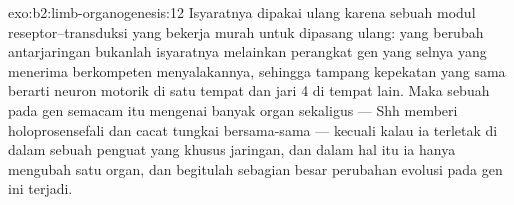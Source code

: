 \begin{solution}{exo:b2:limb-organogenesis:12}
Isyaratnya dipakai ulang karena sebuah modul reseptor--transduksi yang
bekerja murah untuk dipasang ulang: yang berubah antarjaringan bukanlah
isyaratnya melainkan perangkat gen yang selnya yang menerima berkompeten
menyalakannya, sehingga tampang kepekatan yang sama berarti neuron
motorik di satu tempat dan jari 4 di tempat lain. Maka sebuah 
pada gen semacam itu mengenai banyak organ sekaligus ---  Shh
memberi holoprosensefali dan cacat tungkai bersama-sama --- kecuali
kalau ia terletak di dalam sebuah penguat yang khusus jaringan, dan
dalam hal itu ia hanya mengubah satu organ, dan begitulah sebagian
besar perubahan evolusi pada gen ini terjadi.
\end{solution}

